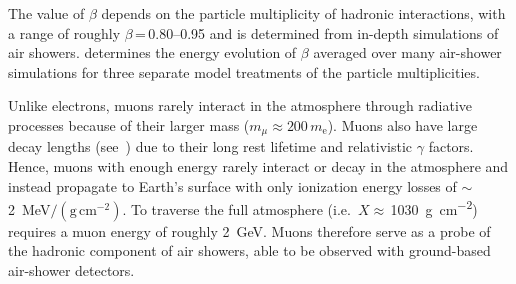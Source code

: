 \noindent
The value of $\beta$ depends on the particle multiplicity of hadronic interactions, with a range of roughly $\beta$\,=\,\numrange{0.80}{0.95} and is determined from in-depth simulations of air showers.
 determines the energy evolution of $\beta$ averaged over many air-shower simulations for three separate model treatments of the particle multiplicities.

Unlike electrons, muons rarely interact in the atmosphere through radiative processes because of their larger mass ($m_{\mu}\approx200\,m_{\text{e}}$).
Muons also have large decay lengths (see~) due to their long rest lifetime and relativistic $\gamma$ factors.
Hence, muons with enough energy rarely interact or decay in the atmosphere and instead propagate to Earth's surface with only ionization energy losses of $\sim$\,\qty{2}{\mega\electronvolt}$/\left(\text{g}\,\text{cm}^{-2}\right)$.
To traverse the full atmosphere (i.e.~$X\approx$\,\qty{1030}{\gram\per\centi\meter\squared}) requires a muon energy of roughly \qty{2}{\giga\electronvolt}.
Muons therefore serve as a probe of the hadronic component of air showers, able to be observed with ground-based air-shower detectors.






